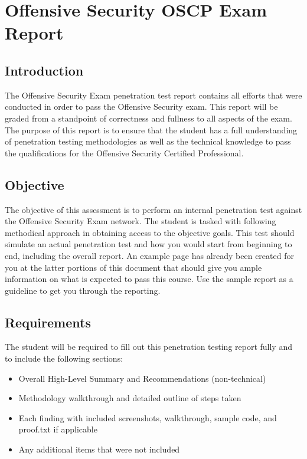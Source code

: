 \hypertarget{offensive-security-oscp-exam-report}{%
\section{Offensive Security OSCP Exam
Report}\label{offensive-security-oscp-exam-report}}

\hypertarget{introduction}{%
\subsection{Introduction}\label{introduction}}

The Offensive Security Exam penetration test report contains all efforts
that were conducted in order to pass the Offensive Security exam. This
report will be graded from a standpoint of correctness and fullness to
all aspects of the exam. The purpose of this report is to ensure that
the student has a full understanding of penetration testing
methodologies as well as the technical knowledge to pass the
qualifications for the Offensive Security Certified Professional.

\hypertarget{objective}{%
\subsection{Objective}\label{objective}}

The objective of this assessment is to perform an internal penetration
test against the Offensive Security Exam network. The student is tasked
with following methodical approach in obtaining access to the objective
goals. This test should simulate an actual penetration test and how you
would start from beginning to end, including the overall report. An
example page has already been created for you at the latter portions of
this document that should give you ample information on what is expected
to pass this course. Use the sample report as a guideline to get you
through the reporting.

\hypertarget{requirements}{%
\subsection{Requirements}\label{requirements}}

The student will be required to fill out this penetration testing report
fully and to include the following sections:

\begin{itemize}
\tightlist
\item
  Overall High-Level Summary and Recommendations (non-technical)
\item
  Methodology walkthrough and detailed outline of steps taken
\item
  Each finding with included screenshots, walkthrough, sample code, and
  proof.txt if applicable
\item
  Any additional items that were not included
\end{itemize}

